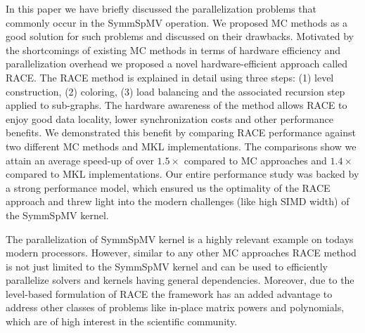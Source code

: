 In this paper we have briefly discussed the parallelization problems
that commonly occur in the \acrshort{SymmSpMV} operation.
We proposed \acrshort{MC} methods as a good solution
for such problems and discussed on their drawbacks.
Motivated by the shortcomings of existing \acrshort{MC} methods in 
terms of hardware efficiency and parallelization overhead we proposed 
a novel hardware-efficient approach called \acrshort{RACE}.
The \acrshort{RACE} method is explained in detail using
three steps: (1) level construction, (2) \DK coloring, (3) load balancing 
and the associated recursion step applied to sub-graphs. 
The hardware awareness of the method allows \acrshort{RACE} to
enjoy good data locality, lower synchronization costs and other performance
benefits. We demonstrated this benefit  by comparing 
\acrshort{RACE} performance against two different \acrshort{MC} methods and \acrshort{MKL}
implementations. The comparisons show 
we attain an average speed-up of over $1.5\times$ compared to \acrshort{MC}
approaches and $1.4\times$ compared to \acrshort{MKL} implementations.
Our entire performance study was backed by a strong performance model, 
which ensured us the optimality of the \acrshort{RACE} approach and
threw light into the modern challenges (like high SIMD width) of the
\acrshort{SymmSpMV} kernel.

The parallelization of \acrshort{SymmSpMV} kernel 
is a highly relevant example on todays modern processors.
However, similar to any other \acrshort{MC} approaches \acrshort{RACE} method 
is not just limited to the \acrshort{SymmSpMV} kernel
and can be used to efficiently parallelize solvers and kernels 
having general \DK dependencies. Moreover, due to the level-based formulation
of \acrshort{RACE} the framework has an added advantage to address 
other classes of problems like in-place matrix powers and polynomials,
which are of high interest in the scientific community. 

